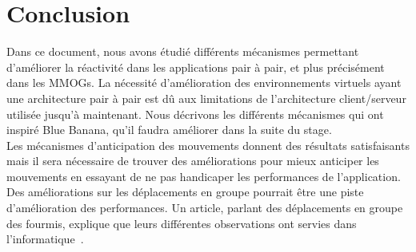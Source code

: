 \section{Conclusion}
	Dans ce document, nous avons étudié différents mécanismes permettant d'améliorer la réactivité dans les applications pair à pair, et plus précisément dans les MMOGs. La nécessité d'amélioration des environnements virtuels ayant une architecture pair à pair est dû aux limitations de l'architecture client/serveur utilisée jusqu'à maintenant. Nous décrivons les différents mécanismes qui ont inspiré Blue Banana, qu'il faudra améliorer dans la suite du stage.\\
	Les mécanismes d'anticipation des mouvements donnent des résultats satisfaisants mais il sera nécessaire de trouver des améliorations pour mieux anticiper les mouvements en essayant de ne pas handicaper les performances de l'application. Des améliorations sur les déplacements en groupe pourrait être une piste d'amélioration des performances. Un  article, parlant des déplacements en groupe des fourmis, explique que leurs différentes observations ont servies dans l'informatique~\cite{fourmis}. 
		
